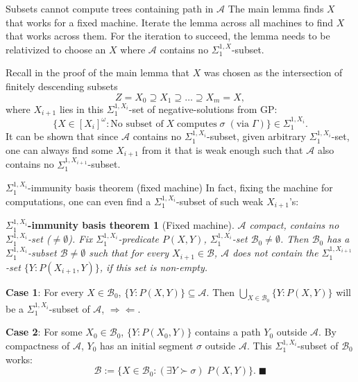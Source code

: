 \begin{frame}{Subsets cannot compute trees containing path in $\mathcal{A}$}
  The main lemma finds $X$ that works for a fixed
  machine. Iterate the lemma across all machines to find $X$ that
  works across them. For the iteration to succeed, the lemma needs
  to be relativized to choose an $X$ where $\mathcal{A}$ contains no
  $\Sigma_1^{1,X}$-subset.

  \vspace{0.5em}
  Recall in the proof of the main lemma that $X$ was
  chosen as the intersection of finitely descending subsets
  \[Z=X_0 \supseteq X_1 \supseteq \ldots\supseteq X_m=X,\]
  where $X_{i+1}$ lies in this $\Sigma_1^{1,X_i}$-set of negative-solutions
  from GP:
  \[\{X\in[X_i]^\omega: \text{No subset of}\; X\; \text{computes}\;
  \sigma\; (\text{via}\; \Gamma)\} \in\Sigma_1^{1,X_i}.\]
  It can be shown that since $\mathcal{A}$ contains no
  $\Sigma_1^{1,X_i}$-subset, given arbitrary $\Sigma_1^{1,X_i}$-set, one
  can always find some $X_{i+1}$ from it that is weak enough such that
  $\mathcal{A}$ also contains no $\Sigma_1^{1,X_{i+1}}$-subset.
\end{frame}

\begin{frame}{$\Sigma_1^{1,X_i}$-immunity basis theorem (fixed machine)}
  In fact, fixing the machine for computations, one can even find a
  $\Sigma_1^{1,X_i}$-subset of such weak $X_{i+1}$'s:
  \newtheorem*{immunity*}{$\Sigma_1^{1,X_i}$-immunity basis theorem}
  \begin{immunity*}[Fixed machine]
    $\mathcal{A}$ compact, contains no $\Sigma_1^{1,X_i}$-set
    ($\neq\emptyset$). Fix $\Sigma_1^{1,X_i}$-predicate $P(X,Y)$,
    $\Sigma_1^{1,X_i}$-set $\mathcal{B}_0\neq\emptyset$. Then
    $\mathcal{B}_0$ has a $\Sigma_1^{1,X_i}$-subset
    $\mathcal{B}\neq\emptyset$ such that for every $X_{i+1}\in\mathcal{B}$,
    $\mathcal{A}$ does not contain the $\Sigma_1^{1,X_{i+1}}$-set
    $\{Y:P(X_{i+1},Y)\}$, if this set is non-empty.
  \end{immunity*}

  \textbf{Case 1}: For every $X\in\mathcal{B}_0$,
  $\{Y:P(X,Y)\}\subseteq\mathcal{A}$. Then $\bigcup_{X\in\mathcal{B}_0}
  \{Y:P(X,Y)\}$ will be a $\Sigma_1^{1,X_i}$-subset of $\mathcal{A}$,
  $\Rightarrow\Leftarrow$.

  \vspace{0.5em}
  \textbf{Case 2}: For some $X_0\in\mathcal{B}_0$, $\{Y:P(X_0,Y)\}$
  contains a path $Y_0$ outside $\mathcal{A}$. By compactness of
  $\mathcal{A}$, $Y_0$ has an initial segment $\sigma$ outside
  $\mathcal{A}$. This $\Sigma_1^{1,X_i}$-subset of $\mathcal{B}_0$ works:
  \[\mathcal{B}:= \{X\in\mathcal{B}_0: (\exists Y\succ\sigma)\; P(X,Y)\}.\;
  \blacksquare\]
\end{frame}

